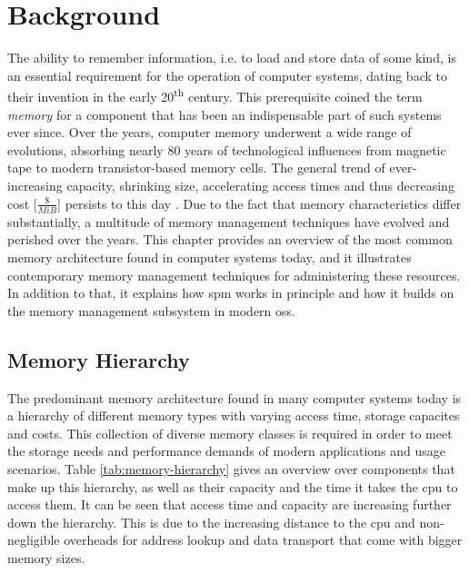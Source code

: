 \chapter{Background}
\label{chap:background}

The ability to remember information, i.e. to load and store data of some kind, is an essential requirement for the operation of computer systems, dating back to their invention in the early 20\textsuperscript{th} century.
This prerequisite coined the term \emph{memory} for a component that has been an indispensable part of such systems ever since.
Over the years, computer memory underwent a wide range of evolutions, absorbing nearly 80 years of technological influences from magnetic tape to modern transistor-based memory cells.
The general trend of ever-increasing capacity, shrinking size, accelerating access times and thus decreasing cost [\emph{$\frac{\$}{MiB}$}] persists to this day \cite{memory-price}.
Due to the fact that memory characteristics differ substantially, a multitude of memory management techniques have evolved and perished over the years.
This chapter provides an overview of the most common memory architecture found in computer systems today, and it illustrates contemporary memory management techniques for administering these resources.
In addition to that, it explains how \ac{spm} works in principle and how it builds on the memory management subsystem in modern \acp{os}.

\section{Memory Hierarchy}
\label{sec:memory-hierarchy}

The predominant memory architecture found in many computer systems today is a hierarchy of different memory types with varying access time, storage capacites and costs.
This collection of diverse memory classes is required in order to meet the storage needs and performance demands of modern applications and usage scenarios.
Table \ref{tab:memory-hierarchy} gives an overview over components that make up this hierarchy, as well as their capacity and the time it takes the \ac{cpu} to access them.
It can be seen that access time and capacity are increasing further down the hierarchy.
This is due to the increasing distance to the \ac{cpu} and non-negligible overheads for address lookup and data transport that come with bigger memory sizes.

